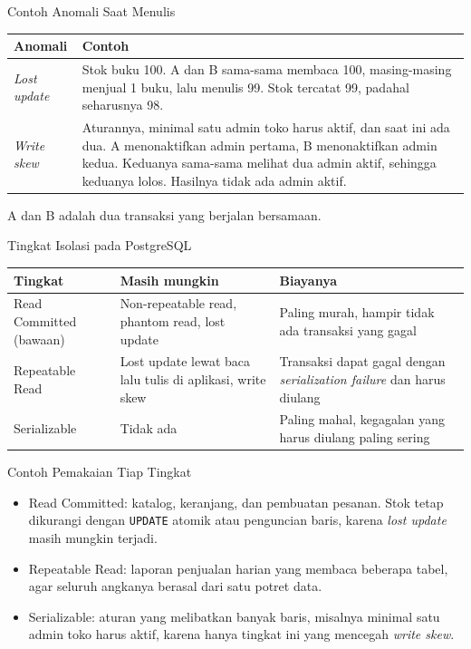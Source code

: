 \documentclass[aspectratio=169, table, 12pt]{beamer}
\begin{document}
\begin{frame}{{\Large Contoh Anomali Saat Menulis}}
  \vspace{5pt}
  \centering
  {\footnotesize
  \begin{tabularx}{\textwidth}{lX}
    \hline
    \textbf{Anomali} & \textbf{Contoh} \\
    \hline
    \textit{Lost update} & Stok buku 100. A dan B sama-sama membaca 100, masing-masing menjual 1 buku, lalu menulis 99. Stok tercatat 99, padahal seharusnya 98. \\
    \hline
    \textit{Write skew} & Aturannya, minimal satu admin toko harus aktif, dan saat ini ada dua. A menonaktifkan admin pertama, B menonaktifkan admin kedua. Keduanya sama-sama melihat dua admin aktif, sehingga keduanya lolos. Hasilnya tidak ada admin aktif. \\
    \hline
  \end{tabularx}}

  \vspace{8pt}
  {\footnotesize A dan B adalah dua transaksi yang berjalan bersamaan.}
\end{frame}

\begin{frame}{{\Large Tingkat Isolasi pada PostgreSQL}}
  \vspace{5pt}
  \centering
  {\small
  \begin{tabularx}{\textwidth}{lYY}
    \hline
    \textbf{Tingkat} & \textbf{Masih mungkin} & \textbf{Biayanya} \\
    \hline
    Read Committed (bawaan) & Non-repeatable read, phantom read, lost update & Paling murah, hampir tidak ada transaksi yang gagal \\
    \hline
    Repeatable Read & Lost update lewat baca lalu tulis di aplikasi, write skew & Transaksi dapat gagal dengan \textit{serialization failure} dan harus diulang \\
    \hline
    Serializable & Tidak ada & Paling mahal, kegagalan yang harus diulang paling sering \\
    \hline
  \end{tabularx}}
\end{frame}

\begin{frame}{{\Large Contoh Pemakaian Tiap Tingkat}}
  \vspace{8pt}
  \begin{itemize}
    \item Read Committed: katalog, keranjang, dan pembuatan pesanan. Stok
          tetap dikurangi dengan \texttt{UPDATE} atomik atau penguncian baris,
          karena \textit{lost update} masih mungkin terjadi.
    \item Repeatable Read: laporan penjualan harian yang membaca beberapa
          tabel, agar seluruh angkanya berasal dari satu potret data.
    \item Serializable: aturan yang melibatkan banyak baris, misalnya minimal
          satu admin toko harus aktif, karena hanya tingkat ini yang mencegah
          \textit{write skew}.
  \end{itemize}
\end{frame}
\end{document}
